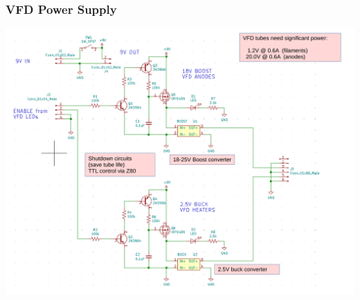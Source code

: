 \documentclass{beamer}
\begin{document}
\begin{frame}
  \frametitle{VFD Power Supply}
  \vskip -0.2in
    \includegraphics[width=\textwidth]{figs/vfd-power-schem-ann.pdf}
\end{frame}
\end{document}

